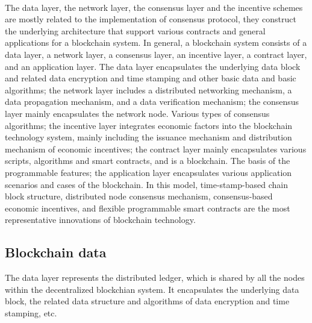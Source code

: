 \documentclass[doublespacing]{bmcart}
\begin{document}
\begin{CJK*}{UTF8}{gbsn}
\paragraph{} The data layer, the network layer, the consensus layer and the incentive schemes are mostly related to the implementation of consensus protocol, they construct the underlying architecture that support various contracts and general applications for a blockchain system.
In general, a blockchain system consists of a data layer, a network layer, a consensus layer, an incentive layer, a contract layer, and an application layer. 
The data layer encapsulates the underlying data block and related data encryption and time stamping and other basic data and basic algorithms; the network layer includes a distributed networking mechanism, a data propagation mechanism, and a data verification mechanism; the consensus layer mainly encapsulates the network node. Various types of consensus algorithms; the incentive layer integrates economic factors into the blockchain technology system, mainly including the issuance mechanism and distribution mechanism of economic incentives; the contract layer mainly encapsulates various scripts, algorithms and smart contracts, and is a blockchain. The basis of the programmable features; the application layer encapsulates various application scenarios and cases of the blockchain. In this model, time-stamp-based chain block structure, distributed node consensus mechanism, consensus-based economic incentives, and flexible programmable smart contracts are the most representative innovations of blockchain technology.

\subsection{Blockchain data}
The data layer represents the distributed ledger, which is shared by all the nodes within the decentralized blockchian system. It encapsulates the underlying data block, %
 the related data structure and algorithms of data encryption and time stamping, etc.

\end{CJK*}
\end{document}

